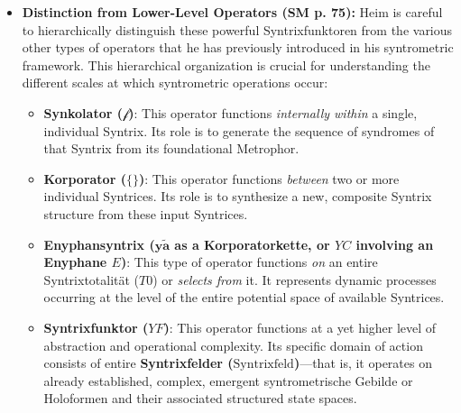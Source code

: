 \documentclass[12pt]{article}
\newcommand{\synkolator}{\mathcal{f}}
\newcommand{\syntrixtotalitaet}{T0}
\newcommand{\syntrixfeld}{\text{Syntrixfeld}}
\newcommand{\diskreteEnyphansyntrix}{\bm{y\widetilde{a}}}
\newcommand{\kontinuierlicheEnyphansyntrix}{YC}
\newcommand{\enyphane}{E}
\newcommand{\syntrixfunktor}{YF}
\begin{document}
\begin{itemize}
    \item \textbf{Distinction from Lower-Level Operators (SM p. 75):}
    Heim is careful to hierarchically distinguish these powerful Syntrixfunktoren from the various other types of operators that he has previously introduced in his syntrometric framework. This hierarchical organization is crucial for understanding the different scales at which syntrometric operations occur:
    \begin{itemize}
        \item \textbf{Synkolator (\( \synkolator \))}: This operator functions \textit{internally within} a single, individual Syntrix. Its role is to generate the sequence of syndromes of that Syntrix from its foundational Metrophor.
        \item \textbf{Korporator (\( \{ \} \))}: This operator functions \textit{between} two or more individual Syntrices. Its role is to synthesize a new, composite Syntrix structure from these input Syntrices.
        \item \textbf{Enyphansyntrix (\( \diskreteEnyphansyntrix \) as a Korporatorkette, or \( \kontinuierlicheEnyphansyntrix \) involving an Enyphane \( \enyphane \))}: This type of operator functions \textit{on} an entire Syntrixtotalität (\( \syntrixtotalitaet \)) or \textit{selects from} it. It represents dynamic processes occurring at the level of the entire potential space of available Syntrices.
        \item \textbf{Syntrixfunktor (\( \syntrixfunktor \))}: This operator functions at a yet higher level of abstraction and operational complexity. Its specific domain of action consists of entire \textbf{Syntrixfelder (\(\syntrixfeld\))}—that is, it operates on already established, complex, emergent syntrometrische Gebilde or Holoformen and their associated structured state spaces.
    \end{itemize}


\end{itemize}
\end{document}
